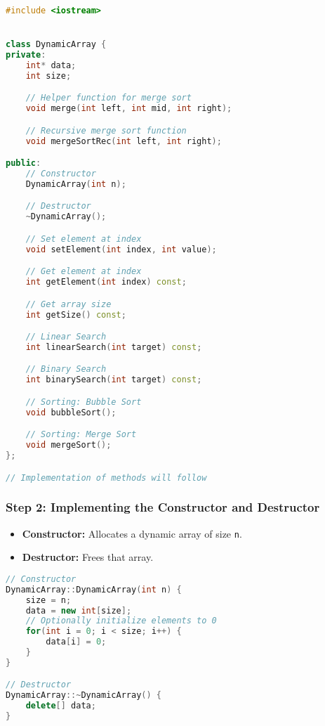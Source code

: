 \documentclass[a4paper,12pt]{article}
\begin{document}
\begin{lstlisting}[language=C++]
#include <iostream>


class DynamicArray {
private:
    int* data;
    int size;

    // Helper function for merge sort
    void merge(int left, int mid, int right);

    // Recursive merge sort function
    void mergeSortRec(int left, int right);

public:
    // Constructor
    DynamicArray(int n);

    // Destructor
    ~DynamicArray();

    // Set element at index
    void setElement(int index, int value);

    // Get element at index
    int getElement(int index) const;

    // Get array size
    int getSize() const;

    // Linear Search
    int linearSearch(int target) const;

    // Binary Search
    int binarySearch(int target) const;

    // Sorting: Bubble Sort
    void bubbleSort();

    // Sorting: Merge Sort
    void mergeSort();
};

// Implementation of methods will follow
\end{lstlisting}

\subsubsection*{Step 2: Implementing the Constructor and Destructor}
\begin{itemize}
    \item \textbf{Constructor:} Allocates a dynamic array of size \texttt{n}.
    \item \textbf{Destructor:} Frees that array.
\end{itemize}

\begin{lstlisting}[language=C++]
// Constructor
DynamicArray::DynamicArray(int n) {
    size = n;
    data = new int[size];
    // Optionally initialize elements to 0
    for(int i = 0; i < size; i++) {
        data[i] = 0;
    }
}

// Destructor
DynamicArray::~DynamicArray() {
    delete[] data;
}
\end{lstlisting}
\end{document}
